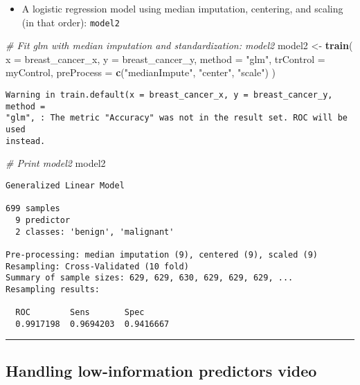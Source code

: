 \documentclass[
]{book}
\newenvironment{Shaded}{\begin{snugshade}}{\end{snugshade}}
\newcommand{\CommentTok}[1]{\textcolor[rgb]{0.56,0.35,0.01}{\textit{#1}}}
\newcommand{\DataTypeTok}[1]{\textcolor[rgb]{0.13,0.29,0.53}{#1}}
\newcommand{\KeywordTok}[1]{\textcolor[rgb]{0.13,0.29,0.53}{\textbf{#1}}}
\newcommand{\NormalTok}[1]{#1}
\newcommand{\StringTok}[1]{\textcolor[rgb]{0.31,0.60,0.02}{#1}}
\providecommand{\tightlist}{%
  \setlength{\itemsep}{0pt}\setlength{\parskip}{0pt}}
\begin{document}
\begin{itemize}
\tightlist
\item
  A logistic regression model using median imputation, centering, and scaling (in that order): \texttt{model2}
\end{itemize}

\begin{Shaded}
\begin{Highlighting}[]
\CommentTok{# Fit glm with median imputation and standardization: model2}
\NormalTok{model2 <-}\StringTok{ }\KeywordTok{train}\NormalTok{(}
  \DataTypeTok{x =}\NormalTok{ breast_cancer_x, }\DataTypeTok{y =}\NormalTok{ breast_cancer_y,}
  \DataTypeTok{method =} \StringTok{"glm"}\NormalTok{,}
  \DataTypeTok{trControl =}\NormalTok{ myControl,}
  \DataTypeTok{preProcess =} \KeywordTok{c}\NormalTok{(}\StringTok{"medianImpute"}\NormalTok{, }\StringTok{"center"}\NormalTok{, }\StringTok{"scale"}\NormalTok{)}
\NormalTok{)}
\end{Highlighting}
\end{Shaded}

\begin{verbatim}
Warning in train.default(x = breast_cancer_x, y = breast_cancer_y, method =
"glm", : The metric "Accuracy" was not in the result set. ROC will be used
instead.
\end{verbatim}

\begin{Shaded}
\begin{Highlighting}[]
\CommentTok{# Print model2}
\NormalTok{model2}
\end{Highlighting}
\end{Shaded}

\begin{verbatim}
Generalized Linear Model 

699 samples
  9 predictor
  2 classes: 'benign', 'malignant' 

Pre-processing: median imputation (9), centered (9), scaled (9) 
Resampling: Cross-Validated (10 fold) 
Summary of sample sizes: 629, 629, 630, 629, 629, 629, ... 
Resampling results:

  ROC        Sens       Spec     
  0.9917198  0.9694203  0.9416667
\end{verbatim}

\begin{center}\rule{0.5\linewidth}{0.5pt}\end{center}

\hypertarget{handling-low-information-predictors-video}{%
\subsection*{Handling low-information predictors video}\label{handling-low-information-predictors-video}}
\end{document}
